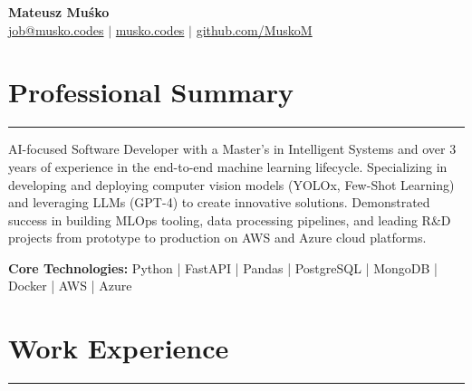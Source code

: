 \documentclass[10pt, a4paper]{article} %
\begin{document}
\begin{center}
    {\Huge \textbf{Mateusz Muśko}} \\
    \vspace{0.1cm}
    \href{mailto:job@musko.codes}{job@musko.codes} $|$
    \href{https://musko.codes}{musko.codes} $|$
    \href{https://github.com/MuskoM}{github.com/MuskoM} \\
\end{center}
\vspace{0.5cm}

\section*{Professional Summary}
\hrule
\vspace{0.2cm}
AI-focused Software Developer with a Master's in Intelligent Systems and over 3 years of experience in the end-to-end machine learning lifecycle. Specializing in developing and deploying computer vision models (YOLOx, Few-Shot Learning) and leveraging LLMs (GPT-4) to create innovative solutions. Demonstrated success in building MLOps tooling, data processing pipelines, and leading R&D projects from prototype to production on AWS and Azure cloud platforms.
\vspace{0.3cm}

\textbf{Core Technologies:} Python | FastAPI | Pandas | PostgreSQL | MongoDB | Docker | AWS | Azure

\vspace{0.5cm}

\section*{Work Experience}
\hrule
\end{document}
